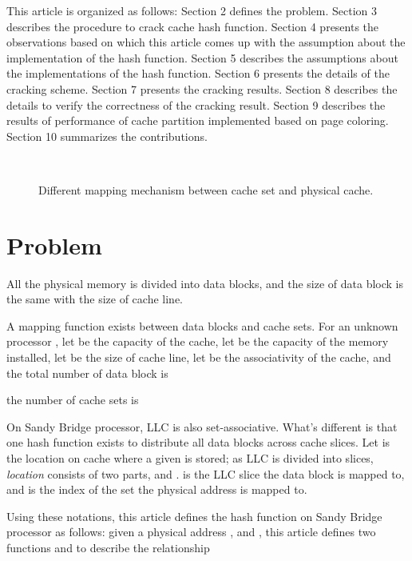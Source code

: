 \documentclass[conference]{IEEEtran}
\newcommand{\SandyBridge}{Sandy Bridge }
\begin{document}
This article is organized as follows: Section 2 defines the problem. Section 3 describes the procedure to crack cache hash function. Section 4 presents the observations based on which this article comes up with the assumption about the implementation of the hash function. Section 5 describes the assumptions about the implementations of the hash function. Section 6 presents the details of the cracking scheme. Section 7 presents the cracking results. Section 8 describes the details to verify the correctness of the cracking result. Section 9 describes the results of performance of cache partition implemented based on page coloring. Section 10 summarizes the contributions.
\begin{figure*}[!htbp]
\centering
{}
	~
	\caption{Different mapping mechanism between cache set and physical cache.}
	\label{fig:PhysicalMappingScheme}
\end{figure*}
\section{Problem}
All the physical memory is divided into data blocks, and the size of data block is the same with the size of cache line.

A mapping function exists between data blocks and cache sets. For an unknown processor , let  be the capacity of the cache, let  be the capacity of the memory installed, 
let  be the size of cache line, let  be the associativity of the cache, and the total number of data block is 

the number of cache sets is 

On Sandy Bridge processor, LLC is also set-associative. What's different is that one hash function exists to distribute all data blocks across cache slices.
Let  is the location on cache where a given  is stored; as LLC is divided into slices, \emph{location} consists of two parts,  and .  is the LLC slice the data block is mapped to, and  is the index of the set the physical address is mapped to. 

Using these notations, this article defines the hash function on \SandyBridge processor as follows: given a physical address ,  and , this article defines two functions  and  to describe the relationship
\end{document}
